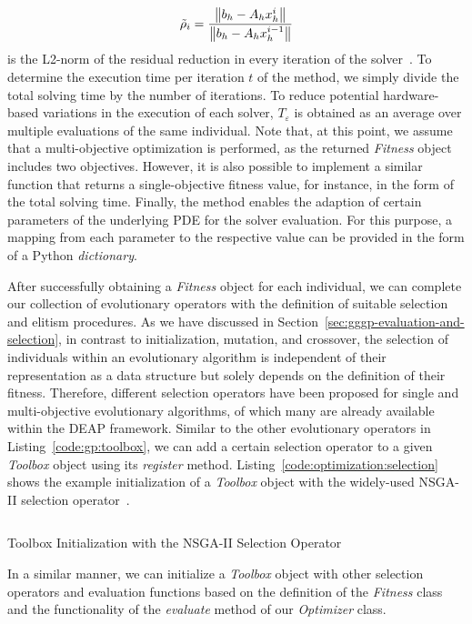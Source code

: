 \begin{equation}
	\tilde{\rho}_{i} = \frac{\norm{b_h - A_h x_{h}^i }}{\norm{b_h - A_h x^{i-1}_{h}}}
\end{equation}
is the L2-norm of the residual reduction in every iteration of the solver~\cite{trottenberg2000multigrid}.
To determine the execution time per iteration $t$ of the method, we simply divide the total solving time by the number of iterations.
To reduce potential hardware-based variations in the execution of each solver, $T_\varepsilon$ is obtained as an average over multiple evaluations of the same individual.
Note that, at this point, we assume that a multi-objective optimization is performed, as the returned \emph{Fitness} object includes two objectives.
However, it is also possible to implement a similar function that returns a single-objective fitness value, for instance, in the form of the total solving time.
Finally, the method enables the adaption of certain parameters of the underlying PDE for the solver evaluation.
For this purpose, a mapping from each parameter to the respective value can be provided in the form of a Python \emph{dictionary}.

After successfully obtaining a \emph{Fitness} object for each individual, we can complete our collection of evolutionary operators with the definition of suitable selection and elitism procedures.
As we have discussed in Section~\ref{sec:gggp-evaluation-and-selection}, in contrast to initialization, mutation, and crossover, the selection of individuals within an evolutionary algorithm is independent of their representation as a data structure but solely depends on the definition of their fitness.
Therefore, different selection operators have been proposed for single and multi-objective evolutionary algorithms, of which many are already available within the DEAP framework.  
Similar to the other evolutionary operators in Listing~\ref{code:gp:toolbox}, we can add a certain selection operator to a given \emph{Toolbox} object using its \emph{register} method.
Listing~\ref{code:optimization:selection} shows the example initialization of a \emph{Toolbox} object with the widely-used NSGA-II selection operator~\cite{deb2002fast}. 
\begin{listing}
	\inputminted{python}{evostencils/optimization/selection.py}
	\caption{Toolbox Initialization with the NSGA-II Selection Operator}
	\label{code:optimization:selection}
\end{listing}
In a similar manner, we can initialize a \emph{Toolbox} object with other selection operators and evaluation functions based on the definition of the \emph{Fitness} class and the functionality of the \emph{evaluate} method of our \emph{Optimizer} class.


